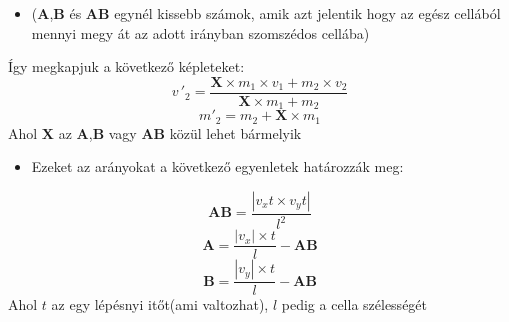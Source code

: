 \documentclass{beamer}
\begin{document}
	\begin{frame}
	\begin{itemize}\item($\mathbf{A}$,$\mathbf{B}$ és $\mathbf{AB}$ egynél kissebb számok, amik azt jelentik hogy az egész cellából mennyi megy át az adott irányban szomszédos cellába)\end{itemize}
				\center{}
	\end{frame}
	\begin{frame}
		Így megkapjuk a következő képleteket:
		\begin{equation}
			v\,'_2=\frac{\mathbf{X}\times m_1\times v_1 + m_2\times v_2}{\mathbf{X}\times m_1 + m_2}
		\end{equation}
		\begin{equation}
			m'_2=m_2+\mathbf{X}\times m_1
		\end{equation}
		Ahol $\mathbf{X}$ az $\mathbf{A}$,$\mathbf{B}$ vagy $\mathbf{AB}$ közül lehet bármelyik
	\end{frame}
	\begin{frame}
		\begin{itemize}
			\item Ezeket az arányokat a következő egyenletek határozzák meg:
		\end{itemize}
		\begin{equation}
			\mathbf{AB} = \frac{|v_x t \times v_y t|}{l^2}
		\end{equation}
		\begin{equation}
			\mathbf{A} = \frac{|v_x|\times t}{l}-\mathbf{AB}
		\end{equation}
		\begin{equation}
			\mathbf{B} = \frac{|v_y|\times t}{l}-\mathbf{AB}
		\end{equation}
		Ahol $t$ az egy lépésnyi itőt(ami valtozhat), $l$ pedig a cella szélességét
	\end{frame}
	
\end{document}
